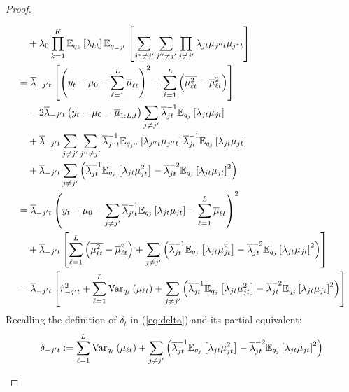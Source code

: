 \begin{proof}
\begin{enumerate}[label=\roman*.]
\begin{align*}
    &\quad + \lambda_0 \prod_{k=1}^K \mathbb{E}_{q_{k}}\left[ \lambda_{kt}\right]\mathbb{E}_{q_{-j'}}\left[\sum_{j^*\neq j'}\sum_{j''\neq j'}  \prod_{j \neq j'} \lambda_{jt} \mu_{j''t} \mu_{j^*t}\right] \\
    &= \overline{\lambda}_{-j't}\left[\left(y_t - \mu_0 - \sum_{\ell=1}^L \overline{\mu}_{\ell t}\right)^2 + \sum_{\ell=1}^L \left(\overline{\mu^2_{\ell t}} - \overline{\mu}^2_{\ell t} \right) \right] \\
    &\quad -2  \overline{\lambda}_{-j't}\left(y_t - \mu_0  - \overline{\mu}_{1:L, t}\right) \sum_{j\neq j'} \overline{\lambda}_{jt}^{-1} \mathbb{E}_{q_{j}}\left[\lambda_{jt} \mu_{jt}\right] \\
    &\quad + \overline{\lambda}_{-j't} \sum_{j\neq j'}\sum_{j''\neq j'} \overline{\lambda}_{j''t}^{-1}\mathbb{E}_{q_{j''}}\left[\lambda_{j''t} \mu_{j''t}\right]\overline{\lambda}_{jt}^{-1}\mathbb{E}_{q_{j}}\left[ \lambda_{jt}\mu_{jt}\right] \\
    &\quad + \overline{\lambda}_{-j't} \sum_{j\neq j'}\left(\overline{\lambda}_{jt}^{-1}\mathbb{E}_{q_{j}}\left[ \lambda_{jt}\mu_{jt}^2\right] -\overline{\lambda}_{jt}^{-2}\mathbb{E}_{q_{j}}\left[ \lambda_{jt}\mu_{jt}\right]^2\right) \\
    &=  \overline{\lambda}_{-j't}\left(y_t - \mu_0 - \sum_{j\neq j'} \overline{\lambda}_{j't}^{-1} \mathbb{E}_{q_{j}}\left[\lambda_{jt} \mu_{jt}\right] - \sum_{\ell=1}^L \overline{\mu}_{\ell t}\right)^2 \\
    &\quad + \overline{\lambda}_{-j't}\left[\sum_{\ell=1}^L \left(\overline{\mu^2_{\ell t}} - \overline{\mu}^2_{\ell t} \right) + \sum_{j\neq j'}\left(\overline{\lambda}_{jt}^{-1}\mathbb{E}_{q_{j}}\left[ \lambda_{jt}\mu_{jt}^2\right] -\overline{\lambda}_{jt}^{-2}\mathbb{E}_{q_{j}}\left[ \lambda_{jt}\mu_{jt}\right]^2\right)\right] \\
    &= \overline{\lambda}_{-j't}\left[\tilde{r}^2_{-j' t} +\sum_{\ell=1}^L \text{Var}_{q_\ell} \left(\mu_{\ell t} \right) + \sum_{j\neq j'}\left(\overline{\lambda}_{jt}^{-1}\mathbb{E}_{q_{j}}\left[ \lambda_{jt}\mu_{jt}^2\right] -\overline{\lambda}_{jt}^{-2}\mathbb{E}_{q_{j}}\left[ \lambda_{jt}\mu_{jt}\right]^2\right)\right]
\end{align*}
\normalsize
Recalling the definition of $\delta_t$ in (\ref{eq:delta}) and its partial equivalent: 
\begin{align*}
    \delta_{-j't} := \sum_{\ell=1}^L \text{Var}_{q_\ell}\left(\mu_{\ell t} \right) + \sum_{j\neq j'}\left(\overline{\lambda}_{jt}^{-1}\mathbb{E}_{q_{j}}\left[ \lambda_{jt}\mu_{jt}^2\right] -\overline{\lambda}_{jt}^{-2}\mathbb{E}_{q_{j}}\left[ \lambda_{jt}\mu_{jt}\right]^2\right)
\end{align*}

\end{enumerate}
\end{proof}
